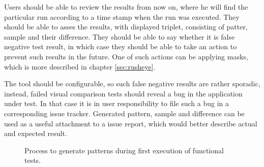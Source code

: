 \documentclass[11pt,oneside,final]{fithesis2}
\begin{document}
  Users should be able to review the results from now on, where he will find the particular run according to a time stamp when the run was executed. They should be able to asses the results,
  with displayed triplet, consisting of patter, sample and their difference. They should be able to say whether it is false negative test result, in which case they should be able to 
  take an action to prevent such results in the future. One of such actions can be applying masks, which is more described in chapter \ref{sec:rusheye}.
  
  The tool should be configurable, so such false negative results are rather sporadic, instead, failed visual comparison tests should reveal a bug in the application under test. In that case
  it is in user responsibility to file such a bug in a corresponding issue tracker. Generated pattern, sample and difference can be used as a useful attachment to a issue report, which
  would better describe actual and expected result.
  
   \begin{figure}[!htb]
    \begin{center}
    \leavevmode
    \centerline{}
    \end{center}
    \caption{Process to generate patterns during first execution of functional tests.}
    \label{fig:FirstTestsRunBMPN}
  \end{figure}
  
\end{document}
